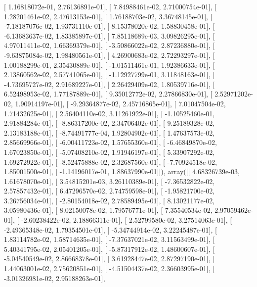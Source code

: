 \documentclass{article}
\begin{document}
       [  1.16818072e-01,   2.76136891e-01],
       [  7.84988461e-02,   2.71000754e-01],
       [  1.28201461e-02,   2.47613153e-01],
       [  1.76188703e-02,   3.36748145e-01],
       [ -7.18187076e-02,   1.93731110e-01],
       [  8.15378020e-02,   1.58830458e-01],
       [ -6.13683637e-02,   1.83385897e-01],
       [  7.85118689e-03,   3.09826295e-01],
       [  4.97011411e-02,   1.66369379e-01],
       [ -3.50866022e-02,   2.87236880e-01],
       [ -9.63875084e-02,   1.98480561e-01],
       [  4.26900683e-02,   2.72293297e-01],
       [  1.00188299e-01,   2.35430889e-01],
       [ -1.01511461e-01,   1.92386633e-01],
       [  2.13860562e-02,   2.57741065e-01],
       [ -1.12927799e-01,   3.11848163e-01],
       [ -4.73695727e-02,   2.91689227e-01],
       [  2.26429409e-02,   1.80539716e-01],
       [  6.52498953e-02,   1.77187889e-01],
       [  9.35012772e-02,   2.27866830e-01],
       [  2.52971202e-02,   1.90914197e-01],
       [ -9.29364877e-02,   2.45716865e-01],
       [  7.01047504e-02,   1.71432625e-01],
       [  2.56404110e-02,   3.11261922e-01],
       [ -1.10525460e-01,   2.91884284e-01],
       [ -8.86317200e-02,   2.34706402e-01],
       [  9.25189328e-02,   2.13183188e-01],
       [ -8.74491777e-04,   1.92804902e-01],
       [  1.47637573e-02,   2.85669966e-01],
       [ -6.00411723e-02,   1.57655360e-01],
       [ -6.46849870e-02,   1.67023850e-01],
       [ -5.07408210e-02,   1.91946197e-01],
       [  5.33907292e-02,   1.69272922e-01],
       [ -8.52475888e-02,   2.32687560e-01],
       [ -7.70924518e-02,   1.85001500e-01],
       [ -1.14196017e-01,   1.88637990e-01]]), array([[  4.68326739e-03,   1.61678070e-01],
       [  3.54815201e-03,   3.26110389e-01],
       [ -7.36532822e-02,   2.57857432e-01],
       [  6.47296570e-02,   2.74759598e-01],
       [ -1.95821700e-02,   3.26756034e-01],
       [ -2.80154018e-02,   2.78589495e-01],
       [  8.13021177e-02,   3.05980436e-01],
       [  8.02150078e-02,   1.79576771e-01],
       [  7.35540534e-02,   2.97059462e-01],
       [ -2.60238422e-02,   2.18866311e-01],
       [  2.52799580e-02,   3.27514063e-01],
       [ -2.49365348e-02,   1.79354501e-01],
       [ -5.34744914e-02,   3.22245487e-01],
       [  1.83114782e-02,   1.58714635e-01],
       [ -7.37637021e-02,   3.11563499e-01],
       [  5.40341795e-02,   2.05401205e-01],
       [ -5.87317912e-02,   1.48600607e-01],
       [ -5.04540549e-02,   2.86668378e-01],
       [  3.61928447e-02,   2.87297190e-01],
       [  1.44063001e-02,   2.75620851e-01],
       [ -4.51504437e-02,   2.36603995e-01],
       [ -3.01326981e-02,   2.95188263e-01],
\end{document}
